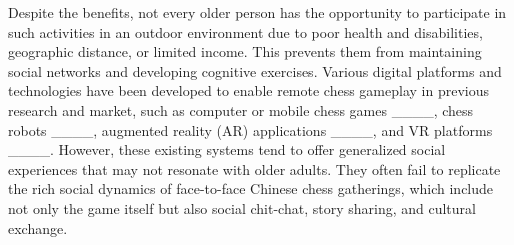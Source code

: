 Despite the benefits, not every older person has the opportunity to participate in such activities in an outdoor environment due to poor health and disabilities, geographic distance, or limited income. This prevents them from maintaining social networks and developing cognitive exercises. Various digital platforms and technologies have been developed to enable remote chess gameplay in previous research and market, such as computer or mobile chess games ____, chess robots ____, augmented reality (AR) applications ____, and VR platforms ____. However, these existing systems tend to offer generalized social experiences that may not resonate with older adults. They often fail to replicate the rich social dynamics of face-to-face Chinese chess gatherings, which include not only the game itself but also social chit-chat, story sharing, and cultural exchange.